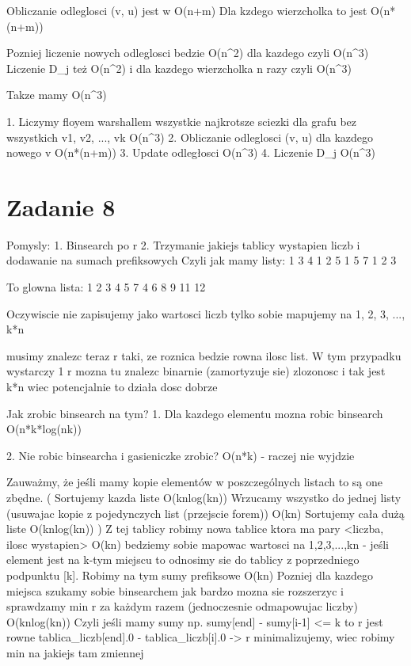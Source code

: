 \documentclass[12pt]{article}
\begin{document}
Obliczanie odleglosci (v, u) jest w O(n+m)
Dla kzdego wierzcholka to jest O(n*(n+m))

Pozniej liczenie nowych odleglosci bedzie O(n^2) dla kazdego czyli O(n^3)
Liczenie D_j też O(n^2) i dla kazdego wierzcholka n razy czyli O(n^3)


Takze mamy O(n^3)

1. Liczymy floyem warshallem wszystkie najkrotsze sciezki dla grafu bez wszystkich v1, v2, ..., vk O(n^3)
2. Obliczanie odleglosci (v, u) dla kazdego nowego v O(n*(n+m))
3. Update odległosci O(n^3)
4. Liczenie D_j O(n^3)

\section{Zadanie 8}
Pomysly:
1. Binsearch po r 
2. Trzymanie jakiejs tablicy wystapien liczb i dodawanie na sumach prefiksowych 
Czyli jak mamy listy:
1 3 4
1 2 5
1 5 7
1 2 3


To glowna lista:
1 2 3 4  5  7
4 6 8 9 11 12

Oczywiscie nie zapisujemy jako wartosci liczb tylko sobie mapujemy na 1, 2, 3, ..., k*n 

musimy znalezc teraz r taki, ze roznica bedzie rowna ilosc list. W tym przypadku wystarczy 1
r mozna tu znalezc binarnie (zamortyzuje sie)
zlozonosc i tak jest k*n wiec potencjalnie to działa dosc dobrze


Jak zrobic binsearch na tym?
1. Dla kazdego elementu mozna robic binsearch O(n*k*log(nk))

2. Nie robic binsearcha i gasieniczke zrobic? O(n*k) - raczej nie wyjdzie


Zauważmy, że jeśli mamy kopie elementów w poszczególnych listach to są one zbędne.
(
Sortujemy kazda liste O(knlog(kn))
Wrzucamy wszystko do jednej listy (usuwajac kopie z pojedynczych list (przejscie forem)) O(kn)
Sortujemy cała dużą liste O(knlog(kn))
)
Z tej tablicy robimy nowa tablice ktora ma pary <liczba, ilosc wystapien> O(kn)
bedziemy sobie mapowac wartosci na 1,2,3,...,kn - jeśli element jest na k-tym miejscu to odnosimy sie do tablicy z poprzedniego podpunktu [k].
Robimy na tym sumy prefiksowe  O(kn)
Pozniej dla kazdego miejsca szukamy sobie binsearchem jak bardzo mozna sie rozszerzyc i sprawdzamy min r za każdym razem (jednoczesnie odmapowujac liczby) O(knlog(kn))
Czyli jeśli mamy sumy np.
sumy[end] - sumy[i-1] <= k to r jest rowne tablica_liczb[end].0 - tablica_liczb[i].0 -> r minimalizujemy, wiec robimy min na jakiejs tam zmiennej


\egroup
\end{document}
